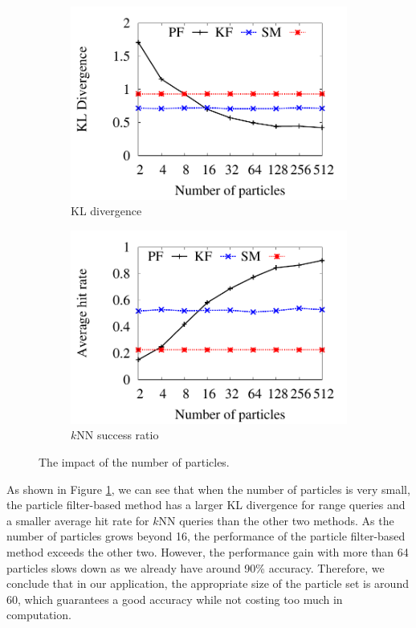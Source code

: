 \documentclass[12pt]{report}
\begin{document}
\begin{figure}[h]
  \centering
  \begin{subfigure}{.5\linewidth}
    \centering
    \includegraphics[width=\textwidth]{img/kl-p.pdf}
    \caption{KL divergence}
  \end{subfigure}%
  \begin{subfigure}{.5\linewidth}
    \centering
    \includegraphics[width=\textwidth]{img/hit-p.pdf}
    \caption{\(k\)NN success ratio}
  \end{subfigure}
  \caption{The impact of the number of particles.}
  \label{fig:number-of-particles}
\end{figure}

As shown in Figure \ref{fig:number-of-particles}, we can see that
when the number of particles is very small, the particle
filter-based method has a larger KL divergence for range queries
and a smaller average hit rate for \(k\)NN queries than the other
two methods.  As the number of particles grows beyond 16, the
performance of the particle filter-based method exceeds the other
two.  However, the performance gain with more than 64 particles
slows down as we already have around 90\% accuracy.  Therefore, we
conclude that in our application, the appropriate size of the
particle set is around 60, which guarantees a good accuracy while
not costing too much in computation.
\end{document}
